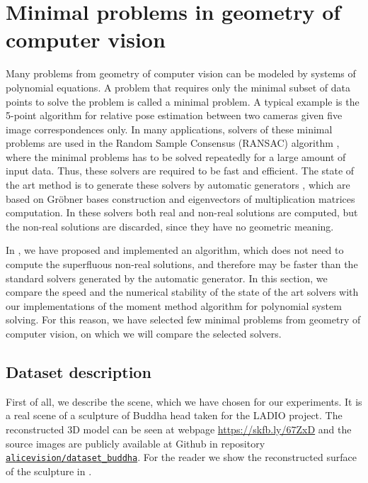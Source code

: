 \chapter{Minimal problems in geometry of computer vision}
Many problems from geometry of computer vision can be modeled by systems of polynomial equations.
A problem that requires only the minimal subset of data points to solve the problem is called a minimal problem.
A typical example is the 5-point algorithm \cite{5pt} for relative pose estimation between two cameras given five image correspondences only.
In many applications, solvers of these minimal problems are used in the Random Sample Consensus (RANSAC) algorithm \cite{ransac}, where the minimal problems has to be solved repeatedly for a large amount of input data.
Thus, these solvers are required to be fast and efficient.
The state of the art method is to generate these solvers by automatic generators \cite{autogen, larsson}, which are based on Gr\"obner bases construction and eigenvectors of multiplication matrices computation.
In these solvers both real and non-real solutions are computed, but the non-real solutions are discarded, since they have no geometric meaning.

In , we have proposed and implemented an algorithm, which does not need to compute the superfluous non-real solutions, and therefore may be faster than the standard solvers generated by the automatic generator.
In this section, we compare the speed and the numerical stability of the state of the art solvers with our implementations of the moment method algorithm for polynomial system solving.
For this reason, we have selected few minimal problems from geometry of computer vision, on which we will compare the selected solvers.

\section{Dataset description}

First of all, we describe the scene, which we have chosen for our experiments.
It is a real scene of a sculpture of Buddha head taken for the LADIO \cite{ladio} project.
The reconstructed 3D model can be seen at webpage \url{https://skfb.ly/67ZxD} and the source images are publicly available at Github in repository \href{https://github.com/alicevision/dataset\_buddha}{\nolinkurl{alicevision/dataset\_buddha}}.
For the reader we show the reconstructed surface of the sculpture in .

